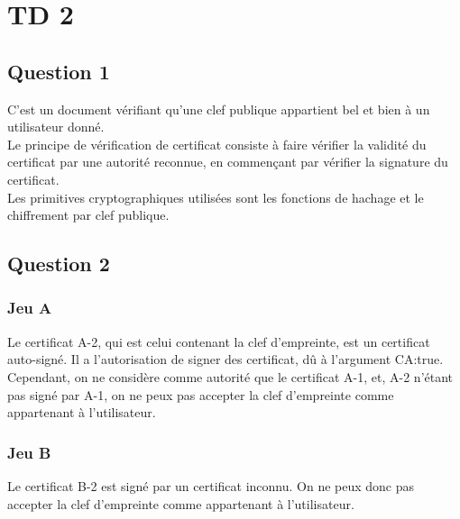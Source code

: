 \section{TD 2}
\subsection*{Question 1}
C'est un document v\'erifiant qu'une clef publique appartient bel et bien \`a un utilisateur donn\'e.\\
Le principe de v\'erification de certificat consiste \`a faire v\'erifier la validit\'e du certificat par une
autorit\'e reconnue, en commen\c cant par v\'erifier la signature du certificat.\\
Les primitives cryptographiques utilis\'ees sont les fonctions de hachage et le chiffrement par clef publique.
\subsection*{Question 2}
\subsubsection*{Jeu A}
Le certificat A-2, qui est celui contenant la clef d'empreinte, est un certificat auto-sign\'e. Il a l'autorisation
de signer des certificat, d\^u \`a l'argument CA:true. Cependant, on ne consid\`ere comme autorit\'e que le
certificat A-1, et, A-2 n'\'etant pas sign\'e par A-1, on ne peux pas accepter la clef d'empreinte comme
appartenant \`a l'utilisateur.
\subsubsection*{Jeu B}
Le certificat B-2 est sign\'e par un certificat inconnu. On ne peux donc pas accepter la clef d'empreinte comme
appartenant \`a l'utilisateur.
